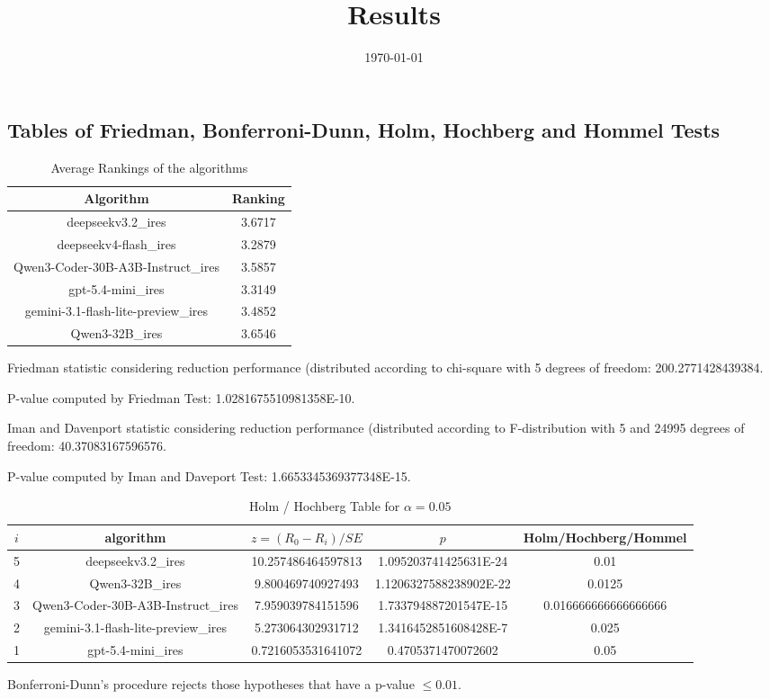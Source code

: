 \documentclass[a4paper,10pt]{article}
\title{Results}
\date{\today}
\begin{document}
\begin{landscape}
\oddsidemargin 0in \topmargin 0in\maketitle
\section{Tables of Friedman, Bonferroni-Dunn, Holm, Hochberg and Hommel Tests}
\begin{table}[!htp]
\centering
\caption{Average Rankings of the algorithms
}\begin{tabular}{c|c}
Algorithm&Ranking\\
\hline
deepseekv3.2_ires&3.6717\\
deepseekv4-flash_ires&3.2879\\
Qwen3-Coder-30B-A3B-Instruct_ires&3.5857\\
gpt-5.4-mini_ires&3.3149\\
gemini-3.1-flash-lite-preview_ires&3.4852\\
Qwen3-32B_ires&3.6546\\
\end{tabular}
\end{table}


Friedman statistic considering reduction performance (distributed according to chi-square with 5 degrees of freedom: 200.2771428439384.


P-value computed by Friedman Test: 1.0281675510981358E-10.\newline

Iman and Davenport statistic considering reduction performance (distributed according to F-distribution with 5 and 24995 degrees of freedom: 40.37083167596576.


P-value computed by Iman and Daveport Test: 1.6653345369377348E-15.\newline

\begin{table}[!htp]
\centering\tiny
\caption{Holm / Hochberg Table for $\alpha=0.05$}
\begin{tabular}{ccccc}
$i$&algorithm&$z=(R_0 - R_i)/SE$&$p$&Holm/Hochberg/Hommel\\
\hline
5&deepseekv3.2_ires&10.257486464597813&1.095203741425631E-24&0.01\\
4&Qwen3-32B_ires&9.800469740927493&1.1206327588238902E-22&0.0125\\
3&Qwen3-Coder-30B-A3B-Instruct_ires&7.959039784151596&1.733794887201547E-15&0.016666666666666666\\
2&gemini-3.1-flash-lite-preview_ires&5.273064302931712&1.3416452851608428E-7&0.025\\
1&gpt-5.4-mini_ires&0.7216053531641072&0.4705371470072602&0.05\\
\hline
\end{tabular}
\end{table}
Bonferroni-Dunn's procedure rejects those hypotheses that have a p-value $\le0.01$.



\end{landscape}
\end{document}
